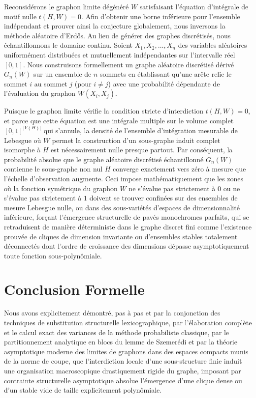 \documentclass[11pt, a4paper]{article}
\begin{document}
Reconsidérons le graphon limite dégénéré $W$ satisfaisant l'équation d'intégrale de motif nulle $t(H, W) = 0$.
Afin d'obtenir une borne inférieure pour l'ensemble indépendant et prouver ainsi la conjecture globalement, nous inversons la méthode aléatoire d'Erdős.
Au lieu de générer des graphes discrétisés, nous échantillonnons le domaine continu. Soient $X_1, X_2, \dots, X_n$ des variables aléatoires uniformément distribuées et mutuellement indépendantes sur l'intervalle réel $[0, 1]$.
Nous construisons formellement un graphe aléatoire discrétisé dérivé $G_n(W)$ sur un ensemble de $n$ sommets en établissant qu'une arête relie le sommet $i$ au sommet $j$ (pour $i \neq j$) avec une probabilité dépendante de l'évaluation du graphon $W(X_i, X_j)$.

Puisque le graphon limite vérifie la condition stricte d'interdiction $t(H, W) = 0$, et parce que cette équation est une intégrale multiple sur le volume complet $[0, 1]^{|V(H)|}$ qui s'annule, la densité de l'ensemble d'intégration mesurable de Lebesgue où $W$ permet la construction d'un sous-graphe induit complet isomorphe à $H$ est nécessairement nulle presque partout.
Par conséquent, la probabilité absolue que le graphe aléatoire discrétisé échantillonné $G_n(W)$ contienne le sous-graphe non nul $H$ converge exactement vers zéro à mesure que l'échelle d'observation augmente.
Ceci impose mathématiquement que les zones où la fonction symétrique du graphon $W$ ne s'évalue pas strictement à $0$ ou ne s'évalue pas strictement à $1$ doivent se trouver confinées sur des ensembles de mesure Lebesgue nulle, ou dans des sous-variétés d'espaces de dimensionnalité inférieure, forçant l'émergence structurelle de pavés monochromes parfaits, qui se retraduisent de manière déterministe dans le graphe discret fini comme l'existence prouvée de cliques de dimension invariante ou d'ensembles stables totalement déconnectés dont l'ordre de croissance des dimensions dépasse asymptotiquement toute fonction sous-polynômiale.

\section{Conclusion Formelle}

Nous avons explicitement démontré, pas à pas et par la conjonction des techniques de substitution structurelle lexicographique, par l'élaboration complète et le calcul exact des variances de la méthode probabiliste classique, par le partitionnement analytique en blocs du lemme de Szemerédi et par la théorie asymptotique moderne des limites de graphons dans des espaces compacts munis de la norme de coupe, que l'interdiction locale d'une sous-structure finie induit une organisation macroscopique drastiquement rigide du graphe, imposant par contrainte structurelle asymptotique absolue l'émergence d'une clique dense ou d'un stable vide de taille explicitement polynômiale.
\end{document}
